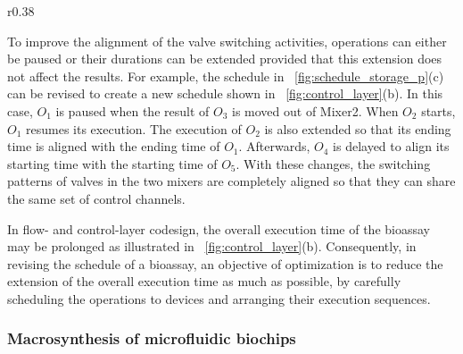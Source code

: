 %
\begin{wrapfigure}[20]{r}{0.38\textwidth}
{
\figurefontsize
\centering

\caption{Flow- and control-layer cosynthesis.}
\label{fig:control_layer}
}
\end{wrapfigure}
%
To improve the alignment of the valve switching activities, 
operations can either be paused or their durations can be  
extended provided that this extension does not affect the results. 
For example, the 
schedule in
\figname~\ref{fig:schedule_storage_p}(c) can be revised to create 
a new schedule shown in \figname~\ref{fig:control_layer}(b). In this
case, $O_1$ is paused when 
the result of $O_3$ is moved out of Mixer2. 
When $O_2$ starts, $O_1$ resumes its execution.
The execution of $O_2$ is also extended so that 
its ending time is aligned with the ending time of $O_1$.
Afterwards, $O_4$ is delayed 
to align its starting time with the starting time
of $O_5$. With these changes, the switching patterns of valves in the two mixers are
completely aligned so that they
can share the same set of control channels.

In flow- and control-layer codesign, the overall execution time of the bioassay
may be prolonged as illustrated in \figname~\ref{fig:control_layer}(b).
Consequently, in revising the schedule of a bioassay, an objective 
of optimization is to
reduce the extension of the overall execution time as much as possible, by
carefully scheduling the operations to devices and arranging their execution
sequences.

\subsubsection{Macrosynthesis of microfluidic biochips}


%

\label{sec:hier_syn}



